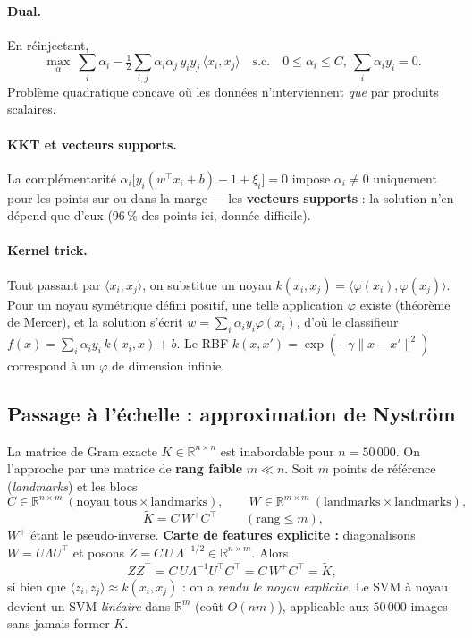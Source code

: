 \documentclass[11pt]{article}
\theoremstyle{remark}
\newcommand{\norm}[1]{\lVert #1 \rVert}
\newcommand{\inner}[2]{\langle #1, #2\rangle}
\newcommand{\T}{^{\top}}
\newcommand{\R}{\mathbb{R}}
\begin{document}
\paragraph{Dual.} En réinjectant,
\begin{equation}
	\max_{\alpha}\ \sum_i\alpha_i-\tfrac12\sum_{i,j}\alpha_i\alpha_j\,y_iy_j\,
	\inner{x_i}{x_j}
	\quad\text{s.c.}\quad 0\le\alpha_i\le C,\ \sum_i\alpha_i y_i=0 .
\end{equation}
Problème quadratique concave où les données n'interviennent \emph{que} par
produits scalaires.
\paragraph{KKT et vecteurs supports.} La complémentarité
$\alpha_i\big[y_i(w\T x_i+b)-1+\xi_i\big]=0$ impose $\alpha_i\neq0$ uniquement pour
les points sur ou dans la marge — les \textbf{vecteurs supports} : la solution
n'en dépend que d'eux (96\,\% des points ici, donnée difficile).
\paragraph{Kernel trick.} Tout passant par $\inner{x_i}{x_j}$, on substitue un
noyau $k(x_i,x_j)=\inner{\varphi(x_i)}{\varphi(x_j)}$. Pour un noyau symétrique
défini positif, une telle application $\varphi$ existe (théorème de Mercer), et la
solution s'écrit $w=\sum_i\alpha_i y_i\varphi(x_i)$, d'où le classifieur
$f(x)=\sum_i\alpha_i y_i\,k(x_i,x)+b$. Le RBF
$k(x,x')=\exp(-\gamma\norm{x-x'}^2)$ correspond à un $\varphi$ de dimension
infinie.

\subsection{Passage à l'échelle : approximation de Nyström}\label{sec:nystrom}
La matrice de Gram exacte $K\in\R^{n\times n}$ est inabordable pour $n=50\,000$.
On l'approche par une matrice de \textbf{rang faible} $m\ll n$. Soit $m$ points de
référence (\emph{landmarks}) et les blocs
\[
C\in\R^{n\times m}\ (\text{noyau tous}\times\text{landmarks}),\qquad
W\in\R^{m\times m}\ (\text{landmarks}\times\text{landmarks}),
\]
\begin{equation}
	\boxed{\ \tilde K = C\,W^{+}C\T\ }\qquad(\text{rang}\le m),
\end{equation}
$W^{+}$ étant le pseudo-inverse. \textbf{Carte de features explicite :}
diagonalisons $W=U\Lambda U\T$ et posons $Z=C\,U\,\Lambda^{-1/2}\in\R^{n\times m}$.
Alors
\begin{equation}
	ZZ\T = C\,U\Lambda^{-1}U\T C\T = C\,W^{+}C\T = \tilde K ,
\end{equation}
si bien que $\inner{z_i}{z_j}\approx k(x_i,x_j)$ : on a \emph{rendu le noyau
	explicite}. Le SVM à noyau devient un SVM \emph{linéaire} dans $\R^{m}$ (coût
$O(nm)$), applicable aux $50\,000$ images sans jamais former $K$.
\end{document}
